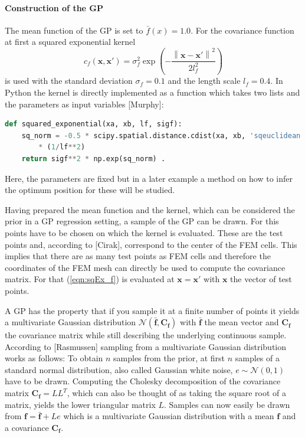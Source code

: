 \documentclass[%
  a4paper,oneside,%
  11pt,%
  smallchapters,
  green,%
  rgb, <cmyk>
  ,]{tubsbook}
\begin{document}
\paragraph{Construction of the GP}
The mean function of the GP is set to $\bar{f}(x) = 1.0$. For the covariance function at first a squared exponential kernel 
%
\begin{equation}
c_f(\bm{x},\bm{x}') =    \sigma_{f}^2 \exp \left(-  \frac{\left \| \bm{x}-{\bm{x}}' \right \|^2}{2l_{f}^2} \right )       
\label{eqn:sqEx_f}
\end{equation}
%
is used with the standard deviation $\sigma_{f} = 0.1$ and the length scale $l_{f} = 0.4$.
In Python the kernel is directly implemented as a function which takes two lists and the parameters as input variables [Murphy]:
\begin{lstlisting}[language=Python]
def squared_exponential(xa, xb, lf, sigf):
    sq_norm = -0.5 * scipy.spatial.distance.cdist(xa, xb, 'sqeuclidean') \
    	* (1/lf**2)
    return sigf**2 * np.exp(sq_norm) .
\end{lstlisting}
\label{lst:sqEx}
%
Here, the parameters are fixed but in a later example a method on how to infer the optimum position for these will be studied.

Having prepared the mean function and the kernel, which can be considered the prior in a GP regression setting, a sample of the GP can be drawn. For this points have to be chosen on which the kernel is evaluated. These are the test points and, according to [Cirak], correspond to the center of the FEM cells. This implies that there are as many test points as FEM cells and therefore the coordinates of the FEM mesh can directly be used to compute the covariance matrix. For that (\ref{eqn:sqEx_f}) is evaluated at $\bm{x} = \bm{x}'$ with $\bm{x}$ the vector of test points. 

A GP has the property that if you sample it at a finite number of points it yields a multivariate Gaussian distribution $\mathcal{N}(\bar{\bm{f}},\bm{C_f})$ with $\bar{\bm{f}}$ the mean vector and $\bm{C_f}$ the covariance matrix while still describing the underlying continuous sample.
According to [Rasmussen] sampling from a multivariate Gaussian distribution works as follows: To obtain $n$ samples from the prior, at first $n$ samples of a standard normal distribution, also called Gaussian white noise, $e \sim \mathcal{N}(0,1)$ have to be drawn. Computing the Cholesky decomposition of the covariance matrix $\bm{C_f} = LL^T$, which can also be thought of as taking the square root of a matrix, yields the lower triangular matrix $L$. Samples can now easily be drawn from $\bm{f} = \bar{\bm{f}} + Le$ which is a multivariate Gaussian distribution with a mean $\bm{f}$ and a covariance $\bm{C_f}$.
\end{document}
